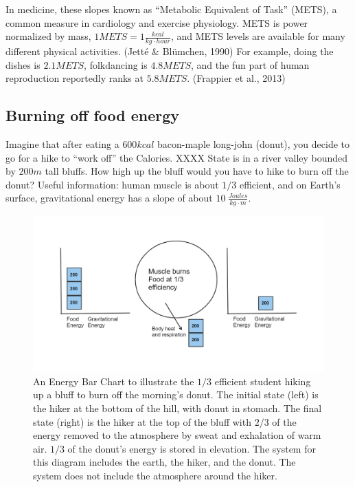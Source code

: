 \documentclass[man]{apa7}
\begin{document}
In medicine, these slopes known as ``Metabolic Equivalent of Task'' (METS), a common measure in cardiology and exercise physiology.  METS is power normalized by mass, $1METS=1\frac{kcal}{kg\cdot hour}$, and METS levels are available for many different physical activities. (Jetté \& Blümchen, 1990) For example, doing the dishes is $2.1METS$, folkdancing is $4.8METS$, and the fun part of human reproduction reportedly ranks at $5.8METS$. (Frappier et al., 2013)

\subsection{Burning off food energy}
Imagine that after eating a $600kcal$ bacon-maple long-john (donut), you decide to go for a hike to ``work off'' the Calories.  
XXXX
State  is in a river valley bounded by $200m$ tall bluffs.  How high up the bluff would you have to hike to burn off the donut?  
Useful information: human muscle is about $1/3$ efficient, and on Earth's surface, gravitational energy has a slope of about $10~\frac{Joules}{kg\cdot m}$.

\begin{figure}[h]
\centering
\includegraphics[width=\columnwidth]{bar_chart.png}
\caption{An Energy Bar Chart to illustrate the $1/3$ efficient student hiking up a bluff to burn off the morning's donut.  The initial state (left) is the hiker at the bottom of the hill, with donut in stomach.  The final state (right) is the hiker at the top of the bluff with $2/3$ of the energy removed to the atmosphere by sweat and exhalation of warm air. $1/3$ of the donut's energy is stored in elevation.  The system for this diagram includes the earth, the hiker, and the donut.  The system does not include the atmosphere around the hiker.  
}
\label{bar_chart}
\end{figure}
\end{document}
